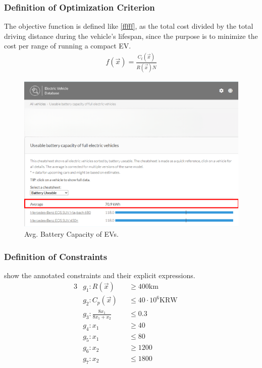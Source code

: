 \documentclass[11pt,twocolumn]{article}
\begin{document}
            \subsubsection{Definition of Optimization Criterion}
                The objective function is defined like \cref{fffff}, as the total cost divided by the total driving distance during the vehicle's lifespan, since the purpose is to minimize the cost per range of running a compact EV.
                \begin{align}
                    \label{fffff}
                    f(\vec{x})=\frac{C_{t}(\vec{x})}{R(\vec{x})N}
                \end{align}

                \begin{figure}[h]
                    \centering
                    \includegraphics[width=.8\columnwidth]{avgCap.png}
                    \caption{Avg. Battery Capacity of EVs.}
                    \label{avgCap}
                \end{figure}


            \subsubsection{Definition of Constraints}
                 show the annotated constraints and their explicit expressions.
                \begin{alignat}{3}
                    &g_1: R(\vec{x})&&\geq 400\mathrm{km} && \label{eqbegin} \\
                    &g_2: C_{p} (\vec{x})&&\leq 40\cdot 10^6\text{KRW} &&\\
                    &g_3: \frac{8x_1}{8x_1 +x_2}&&\leq 0.3 &&\\
                    &g_4: x_1 &&\geq 40 &&\\
                    &g_5: x_1 &&\leq 80 &&\\
                    &g_6: x_2 &&\geq 1200 &&\\
                    &g_7: x_2 &&\leq 1800 && \label{eqend}
                \end{alignat}
\end{document}
